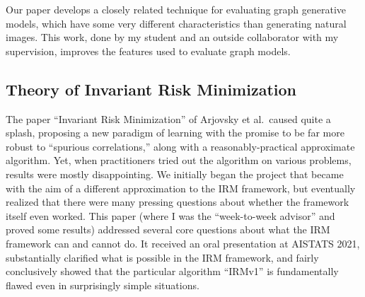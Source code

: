 \documentclass[12pt]{article}
\begin{document}
Our paper \cite{shirzad:contrastive-graph-eval} develops a closely related technique for evaluating graph generative models, which have some very different characteristics than generating natural images. This work, done by my student and an outside collaborator with my supervision, improves the features used to evaluate graph models.


\subsection{Theory of Invariant Risk Minimization} \label{sec:irm}
The paper ``Invariant Risk Minimization'' of Arjovsky et al.\ caused quite a splash, proposing a new paradigm of learning with the promise to be far more robust to ``spurious correlations,'' along with a reasonably-practical approximate algorithm. Yet, when practitioners tried out the algorithm on various problems, results were mostly disappointing. We initially began the project that became \cite{kamath:irm} with the aim of a different approximation to the IRM framework, but eventually realized that there were many pressing questions about whether the framework itself even worked. This paper (where I was the ``week-to-week advisor'' and proved some results) addressed several core questions about what the IRM framework can and cannot do. It received an oral presentation at AISTATS 2021, substantially clarified what is possible in the IRM framework, and fairly conclusively showed that the particular algorithm ``IRMv1'' is fundamentally flawed even in surprisingly simple situations.


% 
% 
\end{document}
